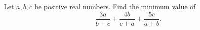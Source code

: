Let $a,b,c$ be positive real numbers. Find the minimum value of
\[
\dfrac{3a}{b+c}+\dfrac{4b}{c+a}+\dfrac{5c}{a+b}.
\]
